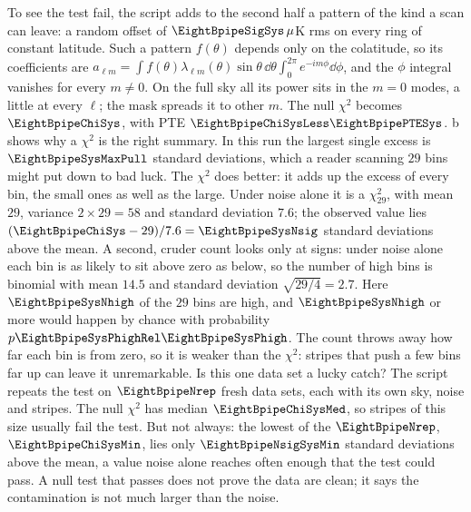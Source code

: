 To see the test fail, the script adds to the second half a pattern of the kind a scan can leave: a
random offset of $\EightBpipeSigSys\,\mu$K rms on every ring of constant latitude. Such a pattern $f(\theta)$ depends
only on the colatitude, so its coefficients are
$a_{\ell m}=\int f(\theta)\lambda_{\ell m}(\theta)\sin\theta\,\dd\theta\int_0^{2\pi}e^{-im\phi}\dd\phi$, and the $\phi$ integral vanishes for
every $m\neq0$. On the full sky all its power sits in the $m=0$ modes, a little at every $\ell$; the mask
spreads it to other $m$. The null $\chi^2$ becomes $\EightBpipeChiSys$, with PTE
$\EightBpipeChiSysLess\EightBpipePTESys$. b shows why a $\chi^2$ is the right summary. In this run the largest single excess is
$\EightBpipeSysMaxPull$ standard deviations, which a reader scanning $29$ bins might put down to bad luck. The
$\chi^2$ does better: it adds up the excess of every bin, the small ones as well as the large. Under
noise alone it is a $\chi^2_{29}$, with mean $29$, variance $2\times29=58$ and standard deviation $7.6$; the observed
value lies $(\EightBpipeChiSys-29)/7.6=\EightBpipeSysNsig$ standard deviations above the mean.
A second, cruder count looks only at signs: under noise alone each bin is as likely to sit above
zero as below, so the number of high bins is binomial with mean $14.5$ and standard deviation
$\sqrt{29/4}=2.7$. Here $\EightBpipeSysNhigh$ of the $29$ bins are high, and $\EightBpipeSysNhigh$ or more would
happen by chance with probability $p\EightBpipeSysPhighRel\EightBpipeSysPhigh$. The count throws away how far each
bin is from zero, so it is weaker than the $\chi^2$: stripes that push a few bins far up can leave it
unremarkable.
Is this one data set a lucky catch? The script repeats the test on $\EightBpipeNrep$ fresh data sets, each
with its own sky, noise and stripes. The null $\chi^2$ has median $\EightBpipeChiSysMed$, so stripes of this size
usually fail the test. But not always: the lowest of the $\EightBpipeNrep$, $\EightBpipeChiSysMin$, lies only
$\EightBpipeNsigSysMin$ standard deviations above the mean, a value noise alone reaches often enough that the
test could pass. A null test that passes does not prove the
data are clean; it says the contamination is not much larger than the noise.

